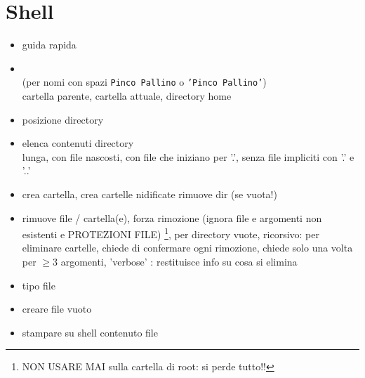 \documentclass[10pt, oneside]{Book}
\begin{document}
\section{Shell}
\begin{itemize}
\item {} guida rapida

\item {}  \\(per nomi con spazi \texttt{Pinco\ Pallino} o \texttt{'Pinco Pallino'})
\\ cartella parente,  cartella attuale,  directory home

\item {} posizione directory

\item {}  elenca contenuti directory \\ lunga,   con file nascosti,   con file che iniziano per '.',   senza file impliciti con '.' e '..'

\item {} crea cartella,  crea cartelle nidificate  rimuove dir (se vuota!)

\item {} rimuove file / cartella(e),  forza rimozione (ignora file e argomenti non esistenti e PROTEZIONI FILE) \footnote{NON USARE MAI  sulla cartella di root: si perde tutto!!},  per directory vuote,   ricorsivo: per eliminare cartelle,  chiede di confermare ogni rimozione,  chiede solo una volta per $\geq3$ argomenti,  'verbose' : restituisce info su cosa si elimina

\item {} tipo file

\item {} creare file vuoto

\item {} stampare su shell contenuto file


\end{itemize}
\end{document}
